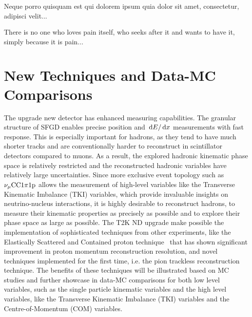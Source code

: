 \begin{savequote}[8cm]
\textlatin{Neque porro quisquam est qui dolorem ipsum quia dolor sit amet, consectetur, adipisci velit...}

There is no one who loves pain itself, who seeks after it and wants to have it, simply because it is pain...
\end{savequote}

\chapter{\label{ch:4-datamc}New Techniques and Data-MC Comparisons} 

The upgrade new detector has enhanced measuring capabilities. 
The granular structure of SFGD enables precise position and $\,\textrm{d}E/\,\textrm{d}x$ measurements with fast response.
This is especially important for hadrons, as they tend to have much shorter tracks and are conventionally harder to reconstruct in scintillator detectors compared to muons.
As a result, the explored hadronic kinematic phase space is relatively restricted and the reconstructed hadronic variables have relatively large uncertainties.
Since more exclusive event topology such as $\nu_{\mu}\textrm{CC}1\pi1\textrm{p}$ allows the measurement of high-level variables like the Transverse Kinematic Imbalance (TKI) variables, which provide invaluable insights on neutrino-nucleus interactions, it is highly desirable to reconstruct hadrons, to measure their kinematic properties as precisely as possible and to explore their phase space as large as possible.
The T2K ND upgrade make possible the implementation of sophisticated techniques from other experiments, like the Elastically Scattered and Contained proton technique~\cite{Lu:2016mjf} that has shown significant improvement in proton momentum reconstruction resolution, and novel techniques implemented for the first time, i.e. the pion trackless reconstruction technique.
The benefits of these techniques will be illustrated based on MC studies and further showcase in data-MC comparisons for both low level variables, such as the single particle kinematic variables and the high level variables, like the Transverse Kinematic Imbalance (TKI) variables and the Centre-of-Momentum (COM) variables. 


